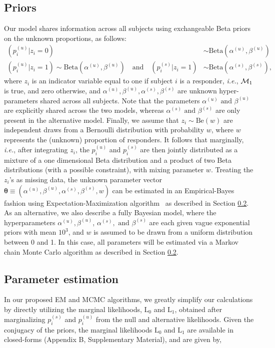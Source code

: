 \documentclass[12pt,oupdraft]{biostatistics}
\begin{document}
\subsection{Priors}
\label{ss:priors}
Our model shares information across all subjects using exchangeable Beta priors on the unknown proportions, as follows:
 \begin{align*}
(p^{(u)}_{i} | z_{i}=0)  &\sim \mathrm{Beta}(\alpha^{(u)}, \beta^{(u)})\\
(p^{(u)}_{i}|z_{i}=1) \sim \mathrm{Beta}(\alpha^{(u)},
\beta^{(u)}) \quad\mathrm{and}\quad (p^{(s)}_{i} | z_{i}=1)  &\sim \mathrm{Beta}(\alpha^{(s)},\beta^{(s)}),
 \end{align*}
where $z_i$ is an indicator variable equal to one if subject $i$ is a responder, \textit{i.e.}, ${\cal M}_1$ is true, and zero otherwise, and $\alpha^{(u)}, \beta^{(u)}, \alpha^{(s)},\beta^{(s)}$ are unknown hyper-parameters shared across all subjects.
Note that the parameters $\alpha^{(u)} \text{ and } \beta^{(u)}$ are explicitly shared across the two models, whereas $\alpha^{(s)} \text{ and } \beta^{(s)}$ are only present in the alternative model.
Finally, we assume that $z_i\sim \mathrm{Be}(w)$ are independent draws from a Bernoulli distribution with probability $w$, where $w$ represents the (unknown) proportion of responders.
It follows that marginally, \textit{i.e.}, after integrating $z_i$, the $p^{(u)}_{i}$ and $p^{(s)}_{i}$ are then jointly distributed as a mixture of a one dimensional Beta distribution and a product of two Beta distributions (with a possible constraint), with mixing parameter $w$.
Treating the $z_i$'s as missing data, the unknown parameter vector $\boldsymbol\theta\equiv(\alpha^{(u)}, \beta^{(u)}, \alpha^{(s)},\beta^{(s)}, w)$ can be estimated in an Empirical-Bayes fashion using Expectation-Maximization algorithm~\citep{Dempster:1977ul} as described in Section \ref{s:estimation}.
As an alternative, we also describe a fully Bayesian model, where the hyperparameters $\alpha^{(u)}, \beta^{(u)}$, $\alpha^{(s)},\text{ and }\beta^{(s)}$ are each given vague exponential priors with mean $10^3$, and $w$ is assumed to be drawn from a uniform distribution between 0 and 1.
In this case, all parameters will be estimated via a Markov chain Monte Carlo algorithm as described in Section \ref{s:estimation}.

\subsection{Parameter estimation}
\label{s:estimation}
In our proposed EM and MCMC algorithms, we greatly simplify our calculations by directly utilizing the marginal likelihoods, $\mathrm{L}_0$ and $\mathrm{L}_1$, obtained after marginalizing $p^{(s)}_{i}$ and $p^{(u)}_{i}$ from the null and alternative likelihoods. Given the conjugacy of the priors, the marginal likelihoods $\mathrm{L}_0$ and $\mathrm{L}_1$ are available in closed-forms (Appendix B, Supplementary Material), and are given by,
\end{document}
